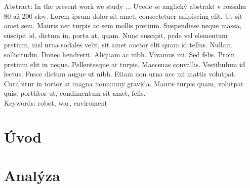 \documentclass[12pt,notitlepage]{report}
\begin{document}
\noindent Abstract: In the present work we study ... Uvede se anglický abstrakt v rozsahu 80 až 200 slov. Lorem ipsum dolor sit amet, consectetuer adipiscing elit. Ut sit amet sem. Mauris nec turpis ac sem mollis pretium. Suspendisse neque massa, suscipit id, dictum in, porta at, quam. Nunc suscipit, pede vel elementum pretium, nisl urna sodales velit, sit amet auctor elit quam id tellus. Nullam sollicitudin. Donec hendrerit. Aliquam ac nibh. Vivamus mi. Sed felis. Proin pretium elit in neque. Pellentesque at turpis. Maecenas convallis. Vestibulum id lectus. Fusce dictum augue ut nibh. Etiam non urna nec mi mattis volutpat. Curabitur in tortor at magna nonummy gravida. Mauris turpis quam, volutpat quis, porttitor ut, condimentum sit amet, felis. \\

\noindent Keywords: robot, war, enviroment

\newpage

\chapter{Úvod}%

\chapter{Analýza}
%


\end{document}
